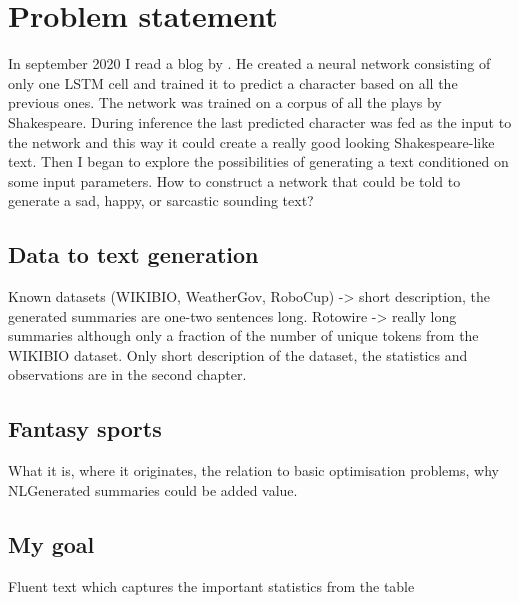 \chapter{Problem statement}
In september 2020 I read a blog by \citep*{Karpathy2015}. He created a neural network consisting of only one LSTM cell and trained it to predict a character based on all the previous ones. The network was trained on a corpus of all the plays by Shakespeare. During inference the last predicted character was fed as the input to the network and this way it could create a really good looking Shakespeare-like text. Then I began to explore the possibilities of generating a text conditioned on some input parameters. How to construct a network that could be told to generate a sad, happy, or sarcastic sounding text?

\section{Data to text generation}
Known datasets (WIKIBIO, WeatherGov, RoboCup) -> short description, the generated summaries are one-two sentences long. Rotowire -> really long summaries although only a fraction of the number of unique tokens from the WIKIBIO dataset. Only short description of the dataset, the statistics and observations are in the second chapter.

\section{Fantasy sports}
What it is, where it originates, the relation to basic optimisation problems, why NLGenerated summaries could be added value.

\section{My goal}
Fluent text which captures the important statistics from the table